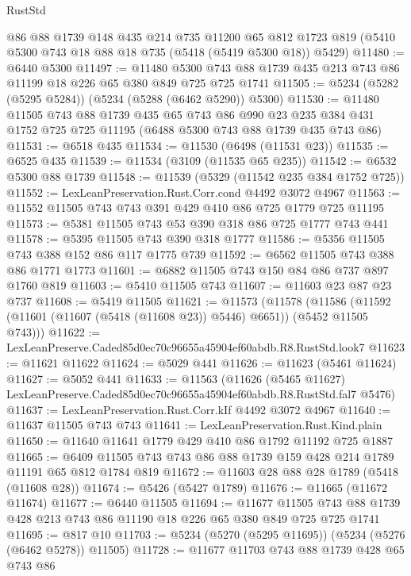 \begin{lexlean}{RustStd}
\begin{coremodule}
    @86
    @88
    @1739
    @148
    @435
    @214
    @735
    @11200
    @65
    @812
    @1723
    @819
    (@5410 @5300 @743 @18 @88 @18 @735 (@5418 (@5419 @5300 @18)) @5429)
@11480 := @6440 @5300
@11497 := @11480
    @5300
    @743
    @88
    @1739
    @435
    @213
    @743
    @86
    @11199
    @18
    @226
    @65
    @380
    @849
    @725
    @725
    @1741
@11505 := @5234 (@5282 (@5295 @5284)) (@5234 (@5288 (@6462 @5290)) @5300)
@11530 := @11480
    @11505
    @743
    @88
    @1739
    @435
    @65
    @743
    @86
    @990
    @23
    @235
    @384
    @431
    @1752
    @725
    @725
    @11195
    (@6488 @5300 @743 @88 @1739 @435 @743 @86)
@11531 := @6518 @435
@11534 := @11530 (@6498 (@11531 @23))
@11535 := @6525 @435
@11539 := @11534 (@3109 (@11535 @65 @235))
@11542 := @6532 @5300 @88 @1739
@11548 := @11539 (@5329 (@11542 @235 @384 @1752 @725))
@11552 := LexLeanPreservation.Rust.Corr.cond @4492 @3072 @4967
@11563 := @11552 @11505 @743 @743 @391 @429 @410 @86 @725 @1779 @725 @11195
@11573 := @5381 @11505 @743 @53 @390 @318 @86 @725 @1777 @743 @441
@11578 := @5395 @11505 @743 @390 @318 @1777
@11586 := @5356 @11505 @743 @388 @152 @86 @117 @1775 @739
@11592 := @6562 @11505 @743 @388 @86 @1771 @1773
@11601 := @6882 @11505 @743 @150 @84 @86 @737 @897 @1760 @819
@11603 := @5410 @11505 @743
@11607 := @11603 @23 @87 @23 @737
@11608 := @5419 @11505
@11621 := @11573
    (@11578
      (@11586 (@11592 (@11601 (@11607 (@5418 (@11608 @23)) @5446) @6651)) (@5452 @11505 @743)))
@11622 := LexLeanPreserve.Caded85d0ec70c96655a45904ef60abdb.R8.RustStd.look7
@11623 := @11621 @11622
@11624 := @5029 @441
@11626 := @11623 (@5461 @11624)
@11627 := @5052 @441
@11633 := @11563
    (@11626 (@5465 @11627) LexLeanPreserve.Caded85d0ec70c96655a45904ef60abdb.R8.RustStd.fal7 @5476)
@11637 := LexLeanPreservation.Rust.Corr.kIf @4492 @3072 @4967
@11640 := @11637 @11505 @743 @743
@11641 := LexLeanPreservation.Rust.Kind.plain
@11650 := @11640 @11641 @1779 @429 @410 @86 @1792 @11192 @725 @1887
@11665 := @6409 @11505 @743 @743 @86 @88 @1739 @159 @428 @214 @1789 @11191 @65 @812 @1784 @819
@11672 := @11603 @28 @88 @28 @1789 (@5418 (@11608 @28))
@11674 := @5426 (@5427 @1789)
@11676 := @11665 (@11672 @11674)
@11677 := @6440 @11505
@11694 := @11677
    @11505
    @743
    @88
    @1739
    @428
    @213
    @743
    @86
    @11190
    @18
    @226
    @65
    @380
    @849
    @725
    @725
    @1741
@11695 := @817 @10
@11703 := @5234 (@5270 (@5295 @11695)) (@5234 (@5276 (@6462 @5278)) @11505)
@11728 := @11677
    @11703
    @743
    @88
    @1739
    @428
    @65
    @743
    @86

\end{coremodule}
\end{lexlean}
